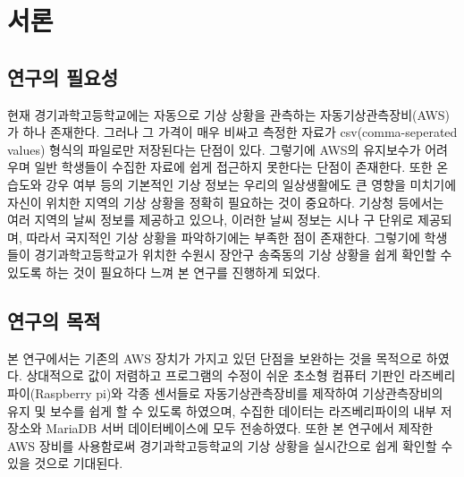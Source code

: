 \section{서론}

\subsection{연구의 필요성}

현재 경기과학고등학교에는 자동으로 기상 상황을 관측하는 자동기상관측장비(AWS)가 하나 존재한다. 그러나 그 가격이 매우 비싸고 측정한 자료가 csv(comma-seperated values) 형식의 파일로만 저장된다는 단점이 있다. 그렇기에 AWS의 유지보수가 어려우며 일반 학생들이 수집한 자료에 쉽게 접근하지 못한다는 단점이 존재한다. 또한 온습도와 강우 여부 등의 기본적인 기상 정보는 우리의 일상생활에도 큰 영향을 미치기에 자신이 위치한 지역의 기상 상황을 정확히 필요하는 것이 중요하다. 기상청 등에서는 여러 지역의 날씨 정보를 제공하고 있으나, 이러한 날씨 정보는 시나 구 단위로 제공되며, 따라서 국지적인 기상 상황을 파악하기에는 부족한 점이 존재한다. 그렇기에 학생들이 경기과학고등학교가 위치한 수원시 장안구 송죽동의 기상 상황을 쉽게 확인할 수 있도록 하는 것이 필요하다 느껴 본 연구를 진행하게 되었다.

\subsection{연구의 목적}
본 연구에서는 기존의 AWS 장치가 가지고 있던 단점을 보완하는 것을 목적으로 하였다. 상대적으로 값이 저렴하고 프로그램의 수정이 쉬운 초소형 컴퓨터 기판인 라즈베리파이(Raspberry pi)와 각종 센서들로 자동기상관측장비를 제작하여 기상관측장비의 유지 및 보수를 쉽게 할 수 있도록 하였으며, 수집한 데이터는 라즈베리파이의 내부 저장소와 MariaDB 서버 데이터베이스에 모두 전송하였다. 또한 본 연구에서 제작한 AWS 장비를 사용함로써 경기과학고등학교의 기상 상황을 실시간으로 쉽게 확인할 수 있을 것으로 기대된다.